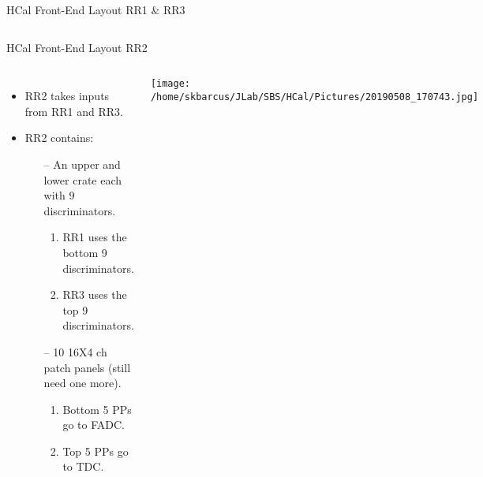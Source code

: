 \documentclass[10pt]{beamer}
\begin{document}
\begin{frame}{HCal Front-End Layout RR1 $\&$ RR3}
\begin{columns}[T,onlytextwidth]
  	
	
	\end{columns}
	
\end{frame}

\begin{frame}{HCal Front-End Layout RR2}

	\begin{columns}[T,onlytextwidth]
	\vspace{8mm}
	\begin{itemize}
		\item RR2 takes inputs from RR1 and RR3.
		\item RR2 contains:
		\begin{itemize}
			\item[--] An upper and lower crate each with 9 discriminators.
			\begin{enumerate}
			
				\item {}\alert{RR1} uses the \alert{bottom 9 discriminators}. 
				\item {}\alert{RR3} uses the \alert{top 9 discriminators}. 
			
			\end{enumerate}
			\item[--] 10 16X4 ch patch panels (still need one more).
			\begin{enumerate}
				\item Bottom 5 PPs go to \alert{FADC}.
				\item Top 5 PPs go to \alert{TDC}.
			\end{enumerate}
		\end{itemize}
	\end{itemize}
	
	  	\begin{center}
  		\texttt{[image: /home/skbarcus/JLab/SBS/HCal/Pictures/20190508\_170743.jpg]}
  		\end{center}
	\end{columns}

\end{frame}
\end{document}
